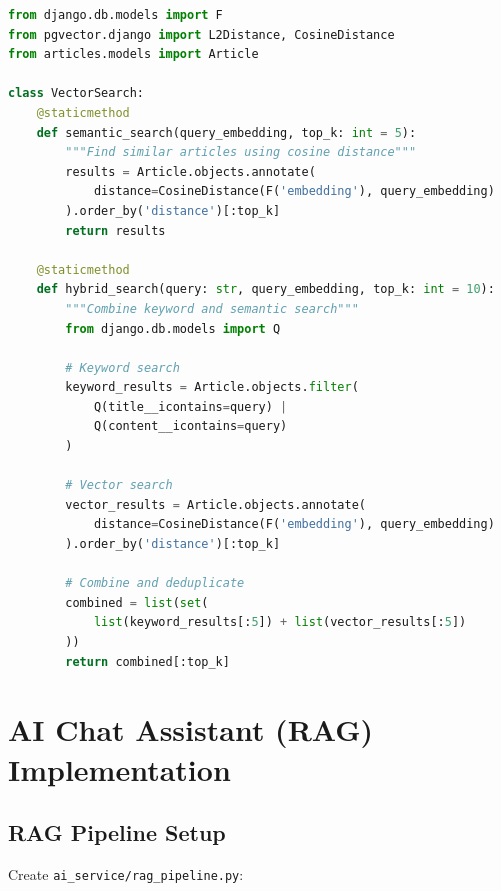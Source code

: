 \documentclass{report}
\begin{document}
\begin{lstlisting}[language=python, caption=Vector similarity search]
from django.db.models import F
from pgvector.django import L2Distance, CosineDistance
from articles.models import Article

class VectorSearch:
    @staticmethod
    def semantic_search(query_embedding, top_k: int = 5):
        """Find similar articles using cosine distance"""
        results = Article.objects.annotate(
            distance=CosineDistance(F('embedding'), query_embedding)
        ).order_by('distance')[:top_k]
        return results
    
    @staticmethod
    def hybrid_search(query: str, query_embedding, top_k: int = 10):
        """Combine keyword and semantic search"""
        from django.db.models import Q
        
        # Keyword search
        keyword_results = Article.objects.filter(
            Q(title__icontains=query) | 
            Q(content__icontains=query)
        )
        
        # Vector search
        vector_results = Article.objects.annotate(
            distance=CosineDistance(F('embedding'), query_embedding)
        ).order_by('distance')[:top_k]
        
        # Combine and deduplicate
        combined = list(set(
            list(keyword_results[:5]) + list(vector_results[:5])
        ))
        return combined[:top_k]
\end{lstlisting}

\chapter{AI Chat Assistant (RAG) Implementation}

\section{RAG Pipeline Setup}

Create \texttt{ai\_service/rag\_pipeline.py}:
\end{document}
